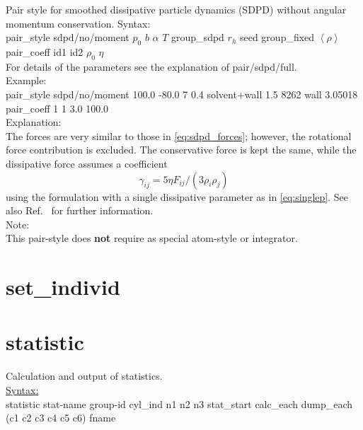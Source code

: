 \documentclass[a4paper,10pt]{scrreprt}
\begin{document}
Pair style for smoothed dissipative particle dynamics (SDPD) without angular momentum conservation.
Syntax:
\\[1ex]
pair\_style      sdpd/no/moment $p_0$ $b$ $\alpha$ $T$ group\_sdpd $r_h$ seed group\_fixed $\left< \rho \right>$
\\[1ex]
pair\_coeff      id1 id2 $\rho_0$ $\eta$\\[2ex]
For details of the parameters see the explanation of pair/sdpd/full.\\[2ex]
Example:
\\[0.5ex]
pair\_style      sdpd/no/moment 100.0 -80.0 7 0.4 solvent+wall 1.5 8262 wall 3.05018
\\[1ex]
pair\_coeff      1 1 3.0 100.0
\\[2ex]
Explanation:\\
The forces are very similar to those in \cref{eq:sdpd_forces}; however, the rotational force contribution is excluded.
The conservative force is kept the same, while the dissipative force assumes a coefficient
\begin{equation}
 \gamma_{ij} = 5\eta F_{ij}/(3\rho_i\rho_j)
\end{equation}
using the formulation with a single dissipative parameter as in \cref{eq:singlep}. See also Ref.~\cite{Espanol_SDPD_2003} for further information.\\[2ex]
Note:\\
This pair-style does \textbf{not} require as special atom-style or integrator.

\section{set\_individ}


\section{statistic}

Calculation and output of statistics.
\\[2ex]
\underline{Syntax:}
\\[1ex]
statistic stat-name group-id cyl\_ind n1 n2 n3 stat\_start calc\_each dump\_each (c1 c2 c3 c4 c5 c6) fname
\end{document}
